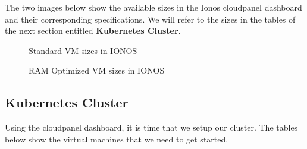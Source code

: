 The two images below show the available  sizes in the Ionos cloudpanel dashboard and their corresponding specifications.
We will refer to the sizes in the tables of the next section entitled \textbf{Kubernetes Cluster}.
\begin{figure}[H]
    \centering
    \caption{Standard VM sizes in IONOS}
    \label{fig:standard-vm-sizes}
\end{figure}
\begin{figure}[H]
    \centering
    \caption{RAM Optimized VM sizes in IONOS}
    \label{fig:ram-optimized-vm-sizes}
\end{figure}

\subsection{Kubernetes Cluster}
Using the cloudpanel dashboard, it is time that we setup our cluster.
The tables below show the virtual machines that we need to get started.

